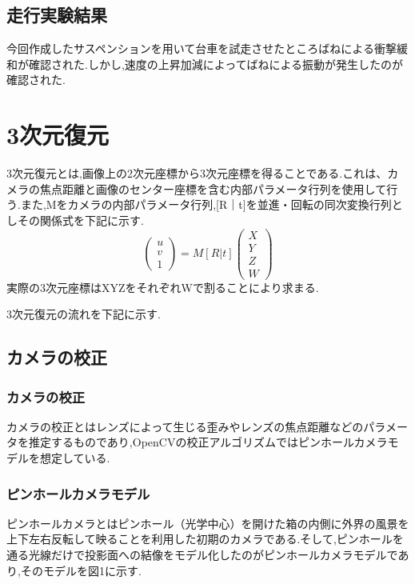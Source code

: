 \documentclass[a4paper]{jarticle}
\begin{document}
\subsection{走行実験結果}
今回作成したサスペンションを用いて台車を試走させたところばねによる衝撃緩和が確認された.しかし,速度の上昇加減によってばねによる振動が発生したのが確認された.


\section{3次元復元}
3次元復元とは,画像上の2次元座標から3次元座標を得ることである.これは、カメラの焦点距離と画像のセンター座標を含む内部パラメータ行列を使用して行う.また,Mをカメラの内部パラメータ行列,[R｜t]を並進・回転の同次変換行列としその関係式を下記に示す.
\begin{equation}
\left(
    \begin{array}{c}
      u \\
      v \\
      1 
    \end{array}
  \right)=M[R|t]\left(
    \begin{array}{c}
      X \\
      Y \\
      Z \\
      W
    \end{array}
  \right)
\end{equation}
実際の3次元座標はXYZをそれぞれWで割ることにより求まる.

3次元復元の流れを下記に示す.

\subsection{カメラの校正}
\subsubsection{カメラの校正}
カメラの校正とはレンズによって生じる歪みやレンズの焦点距離などのパラメータを推定するものであり,OpenCVの校正アルゴリズムではピンホールカメラモデルを想定している.

\subsubsection{ピンホールカメラモデル}
ピンホールカメラとはピンホール（光学中心）を開けた箱の内側に外界の風景を上下左右反転して映ることを利用した初期のカメラである.そして,ピンホールを通る光線だけで投影面への結像をモデル化したのがピンホールカメラモデルであり,そのモデルを図1に示す.
\end{document}

